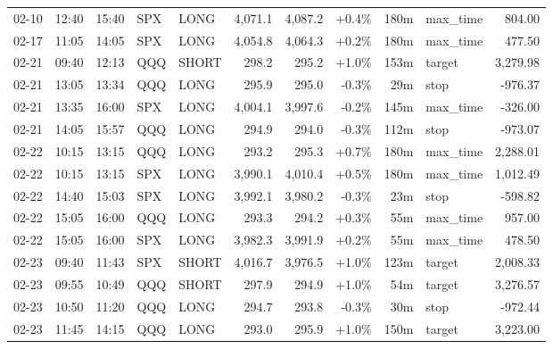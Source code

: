 \documentclass[11pt,a4paper,twoside]{article}
\begin{document}
\begin{center}
\begin{longtable}{>{\color{txtmain}}l l l l l r r r r >{\color{txtmain}}l r}
02-10 & 12:40 & 15:40 & SPX & LONG & 4,071.1 & 4,087.2 & \textcolor{wingreen}{+0.4\%} & 180m & max\_time & \textcolor{wingreen}{804.00} \\
02-17 & 11:05 & 14:05 & SPX & LONG & 4,054.8 & 4,064.3 & \textcolor{wingreen}{+0.2\%} & 180m & max\_time & \textcolor{wingreen}{477.50} \\
02-21 & 09:40 & 12:13 & QQQ & SHORT & 298.2 & 295.2 & \textcolor{wingreen}{+1.0\%} & 153m & target & \textcolor{wingreen}{3,279.98} \\
02-21 & 13:05 & 13:34 & QQQ & LONG & 295.9 & 295.0 & \textcolor{lossred}{-0.3\%} & 29m & stop & \textcolor{lossred}{-976.37} \\
02-21 & 13:35 & 16:00 & SPX & LONG & 4,004.1 & 3,997.6 & \textcolor{lossred}{-0.2\%} & 145m & max\_time & \textcolor{lossred}{-326.00} \\
02-21 & 14:05 & 15:57 & QQQ & LONG & 294.9 & 294.0 & \textcolor{lossred}{-0.3\%} & 112m & stop & \textcolor{lossred}{-973.07} \\
02-22 & 10:15 & 13:15 & QQQ & LONG & 293.2 & 295.3 & \textcolor{wingreen}{+0.7\%} & 180m & max\_time & \textcolor{wingreen}{2,288.01} \\
02-22 & 10:15 & 13:15 & SPX & LONG & 3,990.1 & 4,010.4 & \textcolor{wingreen}{+0.5\%} & 180m & max\_time & \textcolor{wingreen}{1,012.49} \\
02-22 & 14:40 & 15:03 & SPX & LONG & 3,992.1 & 3,980.2 & \textcolor{lossred}{-0.3\%} & 23m & stop & \textcolor{lossred}{-598.82} \\
02-22 & 15:05 & 16:00 & QQQ & LONG & 293.3 & 294.2 & \textcolor{wingreen}{+0.3\%} & 55m & max\_time & \textcolor{wingreen}{957.00} \\
02-22 & 15:05 & 16:00 & SPX & LONG & 3,982.3 & 3,991.9 & \textcolor{wingreen}{+0.2\%} & 55m & max\_time & \textcolor{wingreen}{478.50} \\
02-23 & 09:40 & 11:43 & SPX & SHORT & 4,016.7 & 3,976.5 & \textcolor{wingreen}{+1.0\%} & 123m & target & \textcolor{wingreen}{2,008.33} \\
02-23 & 09:55 & 10:49 & QQQ & SHORT & 297.9 & 294.9 & \textcolor{wingreen}{+1.0\%} & 54m & target & \textcolor{wingreen}{3,276.57} \\
02-23 & 10:50 & 11:20 & QQQ & LONG & 294.7 & 293.8 & \textcolor{lossred}{-0.3\%} & 30m & stop & \textcolor{lossred}{-972.44} \\
02-23 & 11:45 & 14:15 & QQQ & LONG & 293.0 & 295.9 & \textcolor{wingreen}{+1.0\%} & 150m & target & \textcolor{wingreen}{3,223.00} \\

\end{longtable}
\end{center}
\end{document}
